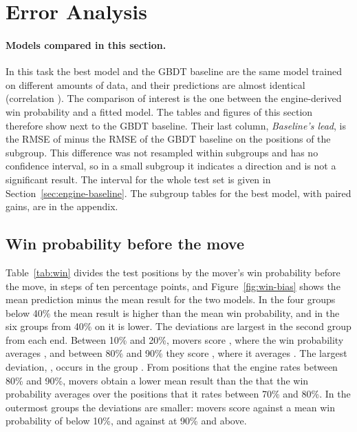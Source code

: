 \documentclass[11pt]{article}
\begin{document}
\section{Error Analysis}
\label{sec:error}



\iflook
\paragraph{Models compared in this section.}
In this task the best model and the GBDT baseline are the same model trained
on different amounts of data, and their predictions are almost identical
(correlation ). The comparison of interest is the
one between the engine-derived win probability and a fitted model. The tables
and figures of this section therefore show  next to the
GBDT baseline. Their last column, \emph{Baseline's lead}, is the RMSE of
 minus the RMSE of the GBDT baseline on the positions of
the subgroup. This difference was not resampled within subgroups and has no
confidence interval, so in a small subgroup it indicates a direction and is
not a significant result. The interval for the whole test set is given in
Section~\ref{sec:engine-baseline}. The subgroup tables for the best model,
with paired gains, are in the appendix.

\subsection{Win probability before the move}

Table~\ref{tab:win} divides the test positions by the mover's win probability
before the move, in steps of ten percentage points, and
Figure~\ref{fig:win-bias} shows the mean prediction minus the mean result for
the two models. In the four groups below 40\% the mean result is higher than
the mean win probability, and in the six groups from 40\% on it is lower. The
deviations are largest in the second group from each end. Between 10\% and
20\%, movers score , where the win probability
averages , and between 80\% and 90\%
they score , where it averages
. The largest deviation,
, occurs in the group
. From positions that the engine
rates between 80\% and 90\%, movers obtain a lower mean result than the
 that the win probability averages over
the positions that it rates between 70\% and 80\%. In the outermost groups
the deviations are smaller: movers score  against a
mean win probability of  below 10\%, and
 against  at
90\% and above.
\end{document}
